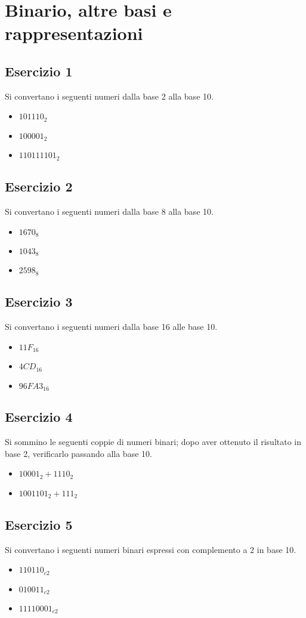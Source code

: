 \documentclass{article}
\begin{document}
\section*{Binario, altre basi e rappresentazioni}
\subsection*{Esercizio 1}
Si convertano i seguenti numeri dalla base 2 alla base 10.
\begin{itemize}
\item ${101110}_2$
\item ${100001}_2$
\item ${110111101}_2$
\end{itemize}

\subsection*{Esercizio 2}
Si convertano i seguenti numeri dalla base 8 alla base 10.
\begin{itemize}
\item ${1670}_8$
\item ${1043}_8$
\item ${2598}_8$
\end{itemize}

\subsection*{Esercizio 3}
Si convertano i seguenti numeri dalla base 16 alle base 10.
\begin{itemize}
\item ${11F}_{16}$
\item ${4CD}_{16}$
\item ${96FA3}_{16}$
\end{itemize}

\subsection*{Esercizio 4}
Si sommino le seguenti coppie di numeri binari; dopo aver ottenuto il risultato in base 2, verificarlo passando alla base 10.
\begin{itemize}
\item ${10001}_2 + {1110}_2$
\item ${1001101}_2 + {111}_2$
\end{itemize}

\subsection*{Esercizio 5}
Si convertano i seguenti numeri binari espressi con complemento a 2 in base 10.
\begin{itemize}
\item ${110110}_{c2}$
\item ${010011}_{c2}$
\item ${11110001}_{c2}$
\end{itemize}
\end{document}
